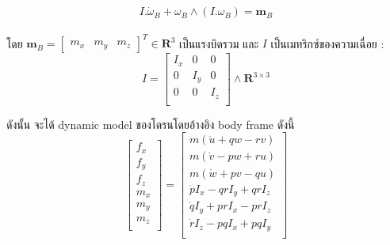 \begin{equation}
	{
		I.\dot{\omega}_B+\omega_B\wedge(I.\omega_B)=\mathbf{m}_B
	}
	\label{equ:total force}
\end{equation}
\\
โดย $\mathbf{m}_B=\begin{bmatrix}m_x & m_y & m_z\end{bmatrix}^T \in \mathbf{R}^3$ เป็นแรงบิดรวม และ $I$ เป็นเมทริกซ์ของความเฉื่อย :
\begin{equation}
	{
		I = \begin{bmatrix}I_x & 0 & 0 \\
		0   & I_y & 0 \\
		0   & 0 & I_z \\
		\end{bmatrix} \wedge \mathbf{R}^{3\times3}
	}
	\label{equ:inertia matrix}
\end{equation}

ดังนั้น จะได้ dynamic model ของโดรนโดยอ้างอิง body frame ดังนี้
\begin{equation}
	{
		\begin{bmatrix}	f_x \\
			f_y \\
			f_z \\
			m_x \\
			m_y \\
			m_z \\   
		\end{bmatrix} = 
		\begin{bmatrix}	m(\dot{u}+qw-rv) \\
			m(\dot{v}-pw+ru)       \\
			m(\dot{w}+pv-qu)       \\
			\dot{p}I_x-qrI_y+qrI_z \\
			\dot{q}I_y+prI_x-prI_z \\
			\dot{r}I_z-pqI_x+pqI_y \\   
		\end{bmatrix}
	}
	\label{equ:dynamic model}
\end{equation}

